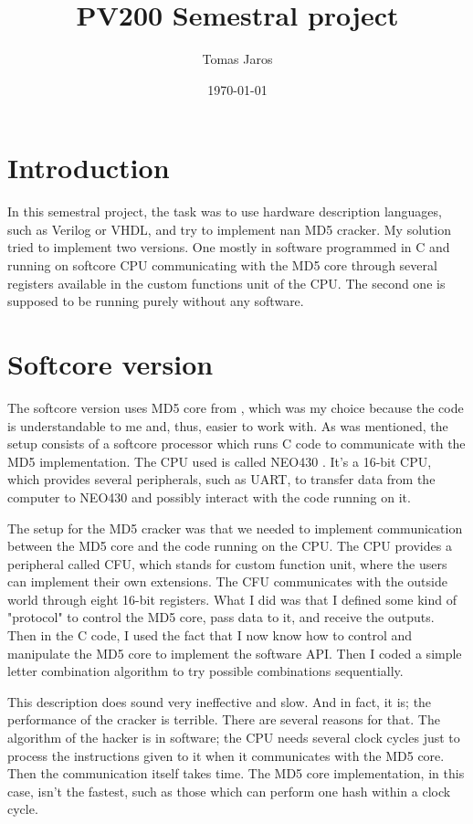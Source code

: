 \documentclass{article}
\title{PV200 Semestral project} %
\author{Tomas Jaros} %
\date{\today} %
\begin{document}

    \maketitle %

    \section{Introduction}
    In this semestral project, the task was to use hardware description languages, such as Verilog or VHDL, and try to implement nan MD5 cracker. My solution tried to implement two versions. One mostly in software programmed in C and running on
    softcore CPU communicating with the MD5 core through several registers available in the custom functions unit of the CPU.
    The second one is supposed to be running purely without any software.

    \section{Softcore version}
    The softcore version uses MD5 core from \cite{md5Cipher}, which was my choice because the code is understandable to me and, thus, easier to work with. As was mentioned, the setup consists of a softcore processor which runs C code to communicate with the MD5 implementation. The CPU used is called NEO430 \cite{neo430}. It's a 16-bit CPU, which provides several peripherals, such as UART, to transfer data from the computer to NEO430 and possibly interact with the code running on it. 

    The setup for the MD5 cracker was that we needed to implement communication between the MD5 core and the code running on the CPU. The CPU provides a peripheral called CFU, which stands for custom function unit, where the users can implement their own extensions. The CFU communicates with the outside world through eight 16-bit registers. What I did was that I defined some kind of "protocol" to control the MD5 core, pass data to it, and receive the outputs. Then in the C code, I used the fact that I now know how to control and manipulate the MD5 core to implement the software API. Then I coded a simple letter combination algorithm to try possible combinations sequentially.

    This description does sound very ineffective and slow. And in fact, it is; the performance of the cracker is terrible.  There are several reasons for that. The algorithm of the hacker is in software; the CPU needs several clock cycles just to process the instructions given to it when it communicates with the MD5 core. Then the communication itself takes time. The MD5 core implementation, in this case, isn't the fastest, such as those which can perform one hash within a clock cycle.
\end{document}
